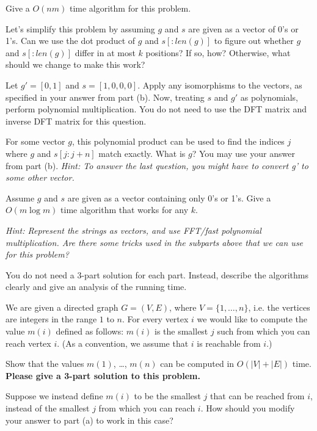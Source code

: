 \documentclass{article}
\begin{document}
\begin{subparts}
\subpart Give a $O(nm)$ time algorithm for this problem.

\subpart Let's simplify this problem by assuming $g$ and $s$ are given as a vector of 0's or 1's. Can we use the dot product of $g$ and $s[:len(g)]$ 
to figure out whether $g$ and $s[:len(g)]$ differ in at most $k$ positions? If so, how? Otherwise, what should we
change to make this work? 

\subpart Let $g' = [0, 1]$ and $s = [1, 0, 0, 0]$. Apply any isomorphisms to the vectors, as specified in your answer from part (b).  
Now, treating $s$ and $g'$ as polynomials, perform polynomial multiplication. You do not need to use the DFT matrix and inverse DFT matrix for this 
question.

For some vector $g$, this polynomial product can be used to find the indices $j$ where $g$ and $s[j:j+n]$ match exactly. What is $g$?
\noindent You may use your answer from part (b).
\emph{Hint: To answer the last question, you might have to convert g' to some other vector.} 

\subpart Assume $g$ and $s$ are given as a vector containing only 0's or 1's. Give a $O(m\log m)$ time algorithm that works for any $k$.

\emph{Hint: Represent the strings as vectors, and use FFT/fast polynomial multiplication. Are there some tricks used in the subparts above that 
    we can use for this problem?}

\end{subparts}

\noindent You do not need a 3-part solution for each part.
Instead, describe the algorithms clearly and give an analysis of the running time.



We are given a directed graph $G=(V,E)$, where
$V = \{1,\ldots,n\}$, i.e. the vertices are
integers in the range $1$ to $n$. For every
vertex $i$ we would like to compute the
value $m(i)$ defined as follows: $m(i)$ is
the smallest $j$ such from which you can reach vertex $i$. 
(As a convention, we assume that $i$
is reachable from $i$.) 

\begin{subparts}
\subpart Show that the values $m(1)$,
\ldots, $m(n)$ can be computed in $O(|V| + |E|)$
time. \\

\textbf{Please give a 3-part solution to this problem.}

\subpart Suppose we instead define $m(i)$ to be the smallest $j$ that can be reached from $i$, instead of the smallest $j$ from which you can reach $i$. How should you modify your answer to part (a) to work in this case? 

\end{subparts}
\end{document}
